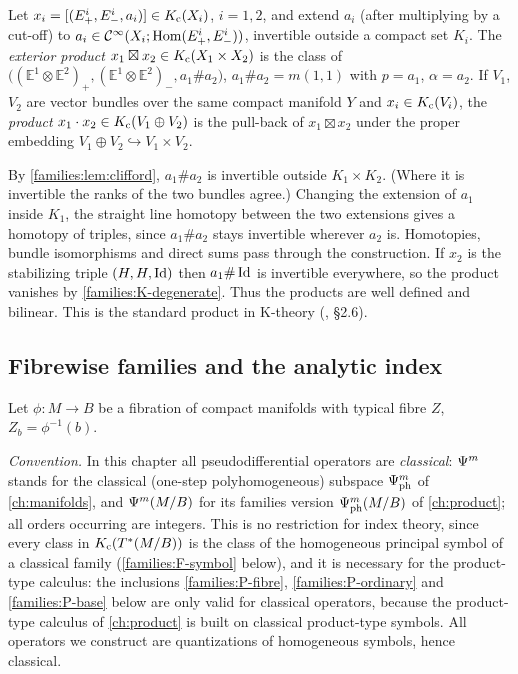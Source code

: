 \begin{definition}\label{families:def:product}
  Let $x_i=[(E^i_+,E^i_-,a_i)]\in K_{\mathrm{c}}(X_i)$, $i=1,2$, and extend $a_i$ (after
  multiplying by a cut-off) to $a_i\in\mathcal{C}^\infty(X_i;\operatorname{Hom}(E^i_+,E^i_-))$, invertible
  outside a compact set $K_i$. The \emph{exterior product}
  $x_1\boxtimes x_2\in K_{\mathrm{c}}(X_1\times X_2)$ is the class of
  $\bigl((\mathbb E^1\otimes\mathbb E^2)_+,(\mathbb E^1\otimes\mathbb E^2)_-,
  a_1\#a_2\bigr)$, $a_1\#a_2=m(1,1)$ with $p=a_1$, $\alpha=a_2$. If $V_1$, $V_2$
  are vector bundles over the same compact manifold $Y$ and $x_i\in K_{\mathrm{c}}(V_i)$,
  the \emph{product} $x_1\cdot x_2\in K_{\mathrm{c}}(V_1\oplus V_2)$ is the pull-back of
  $x_1\boxtimes x_2$ under the proper embedding $V_1\oplus V_2\hookrightarrow
  V_1\times V_2$.
\end{definition}

By \cref{families:lem:clifford}, $a_1\#a_2$ is invertible outside
$K_1\times K_2$. (Where it is invertible the ranks of the two bundles agree.)
Changing the extension of $a_1$ inside $K_1$, the straight line homotopy
between the two extensions gives a homotopy of triples, since $a_1\#a_2$ stays
invertible wherever $a_2$ is. Homotopies, bundle isomorphisms and direct sums
pass through the construction. If $x_2$ is the stabilizing triple $(H,H,\operatorname{Id})$
then $a_1\#\operatorname{Id}$ is invertible everywhere, so the product vanishes by
\ref{families:K-degenerate}. Thus the products are well defined and
bilinear. This is the standard product in K-theory (\cite{Atiyah-K}, \S2.6).

\subsection{Fibrewise families and the analytic index}
Let $\phi:M\to B$ be a fibration of compact manifolds with typical fibre $Z$,
$Z_b=\phi^{-1}(b)$.

\emph{Convention.} In this chapter all pseudodifferential operators are
\emph{classical}: $\Psi^{m}$ stands for the classical (one-step
polyhomogeneous) subspace $\Psi^{m}_{\mathrm{ph}}$ of \cref{ch:manifolds}, and
$\Psi^{m}(M/B)$ for its families version $\Psi^{m}_{\mathrm{ph}}(M/B)$ of
\cref{ch:product}; all orders occurring are integers. This is no restriction for index theory,
since every class in $K_{\mathrm{c}}(T^*(M/B))$ is the class of the homogeneous principal
symbol of a classical family (\ref{families:F-symbol} below), and it is
necessary for the product-type calculus: the inclusions
\ref{families:P-fibre}, \ref{families:P-ordinary} and \ref{families:P-base}
below are only valid for classical operators, because the product-type
calculus of \cref{ch:product} is built on classical product-type symbols. All
operators we construct are quantizations of homogeneous symbols, hence
classical.

